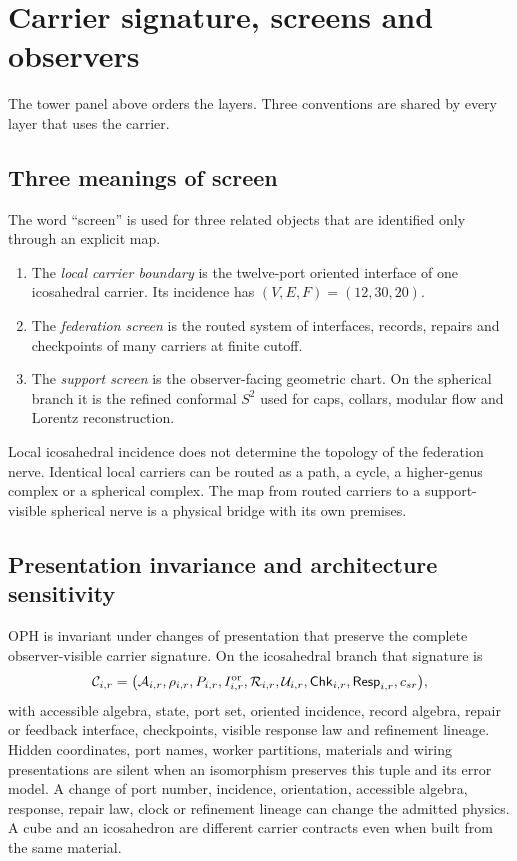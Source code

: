 \section*{Carrier signature, screens and observers}

The tower panel above orders the layers. Three conventions are shared by
every layer that uses the carrier.

\subsection*{Three meanings of screen}

The word ``screen'' is used for three related objects that are identified
only through an explicit map.

\begin{enumerate}[leftmargin=2em]
\item The \emph{local carrier boundary} is the twelve-port oriented interface
of one icosahedral carrier. Its incidence has \((V,E,F)=(12,30,20)\).
\item The \emph{federation screen} is the routed system of interfaces,
records, repairs and checkpoints of many carriers at finite cutoff.
\item The \emph{support screen} is the observer-facing geometric chart. On
the spherical branch it is the refined conformal \(S^2\) used for caps,
collars, modular flow and Lorentz reconstruction.
\end{enumerate}

Local icosahedral incidence does not determine the topology of the federation
nerve. Identical local carriers can be routed as a path, a cycle, a
higher-genus complex or a spherical complex. The map from routed carriers to
a support-visible spherical nerve is a physical bridge with its own premises.

\subsection*{Presentation invariance and architecture sensitivity}

OPH is invariant under changes of presentation that preserve the complete
observer-visible carrier signature. On the icosahedral branch that
signature is
\[
\mathcal C_{i,r}=
\bigl(
\mathcal A_{i,r},\rho_{i,r},P_{i,r},I_{i,r}^{\rm or},
\mathcal R_{i,r},\mathcal U_{i,r},\mathsf{Chk}_{i,r},
\mathsf{Resp}_{i,r},c_{sr}
\bigr),
\]
with accessible algebra, state, port set, oriented incidence, record
algebra, repair or feedback interface, checkpoints, visible response law and
refinement lineage. Hidden coordinates, port names, worker partitions,
materials and wiring presentations are silent when an isomorphism preserves
this tuple and its error model. A change of port number, incidence,
orientation, accessible algebra, response, repair law, clock or refinement
lineage can change the admitted physics. A cube and an icosahedron are
different carrier contracts even when built from the same material.

